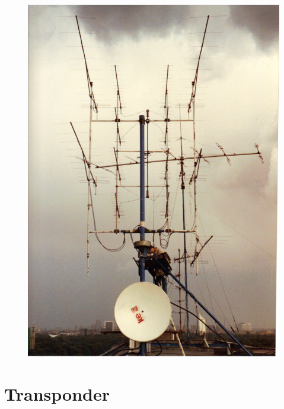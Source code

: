 \begin{frame}
  \begin{center}
    \begin{figure}
      \includegraphics[width=1\textwidth,height=.9\textheight,keepaspectratio]{bv11/1988+89_UKW-Gruppen_G8VHI.jpg}
    \end{figure}
  \end{center}
\end{frame}

\section{Transponder}

